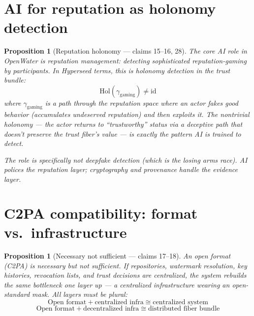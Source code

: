 \documentclass[11pt,a4paper]{article}
\newtheorem{proposition}[definition]{Proposition}
\begin{document}
\section{AI for reputation as holonomy detection}
\label{sec:ai-reputation}

\begin{proposition}[Reputation holonomy --- claims 15--16, 28]
\label{prop:reputation}
The core AI role in OpenWater is reputation management: detecting
sophisticated reputation-gaming by participants. In Hyperseed terms,
this is holonomy detection in the trust bundle:
\[
  \text{Hol}(\gamma_{\text{gaming}}) \neq \text{id}
\]
where $\gamma_{\text{gaming}}$ is a path through the reputation space
where an actor fakes good behavior (accumulates undeserved reputation)
and then exploits it. The nontrivial holonomy --- the actor returns to
``trustworthy'' status via a deceptive path that doesn't preserve the
trust fiber's value --- is exactly the pattern AI is trained to detect.

The role is specifically \emph{not} deepfake detection (which is the
losing arms race). AI polices the reputation layer; cryptography and
provenance handle the evidence layer.
\end{proposition}

\section{C2PA compatibility: format vs.\ infrastructure}
\label{sec:c2pa}

\begin{proposition}[Necessary not sufficient --- claims 17--18]
\label{prop:c2pa}
An open format (C2PA) is necessary but not sufficient. If repositories,
watermark resolution, key histories, revocation lists, and trust
decisions are centralized, the system rebuilds the same bottleneck
one layer up --- a centralized infrastructure wearing an open-standard
mask. All layers must be plural:
\[
  \text{Open format} + \text{centralized infra} \cong \text{centralized system}
\]
\[
  \text{Open format} + \text{decentralized infra} \cong \text{distributed fiber bundle}
\]
\end{proposition}

\end{document}

